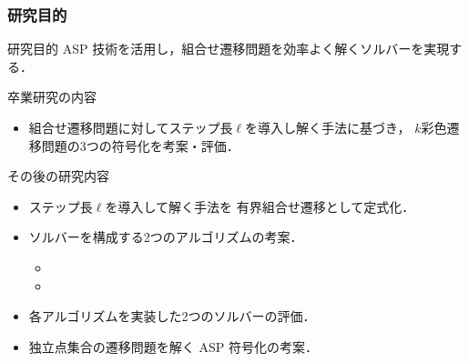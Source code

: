 \documentclass[dvipdfmx,11pt]{beamer}
\begin{document}
\begin{frame}
  \frametitle{研究目的}
  \begin{alertblock}{研究目的}
    ASP 技術を活用し，組合せ遷移問題を効率よく解くソルバーを実現する．
  \end{alertblock}

  \begin{block}{卒業研究の内容}
    \begin{itemize}
      \item 組合せ遷移問題に対してステップ長$\ell$を導入し解く手法に基づき，
        $k$彩色遷移問題の3つの符号化を考案・評価．
    \end{itemize}
  \end{block}

  \begin{block}{その後の研究内容}
    \begin{itemize}
      \item ステップ長$\ell$を導入して解く手法を
        \alert{有界組合せ遷移}として定式化．
      \item ソルバーを構成する2つのアルゴリズムの考案．
        \begin{itemize}
          \item {}
          \item {}
        \end{itemize}
      \item 各アルゴリズムを実装した2つのソルバーの評価．
      \item 独立点集合の遷移問題を解く ASP 符号化の考案．
    \end{itemize}
  \end{block}
\end{frame}
\end{document}
